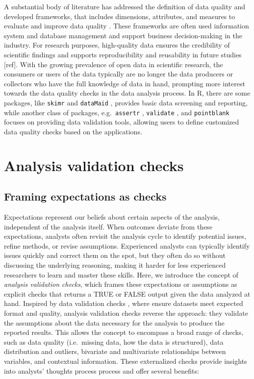 \documentclass[
  12pt,
]{interact}
\begin{document}
A substantial body of literature has addressed the definition of data
quality \citep[more]{8642813} and developed frameworks, that includes
dimensions, attributes, and measures to evaluate and improve data
quality
\citep{cai2015challenges, wang1996beyond, 6204995, woodall2014classification}.
These frameworks are often used information system and database
management and support business decision-making in the industry. For
research purposes, high-quality data ensures the credibility of
scientific findings and supports reproducibility and reusability in
future studies {[}ref{]}. With the growing prevalence of open data in
scientific research, the consumers or users of the data typically are no
longer the data producers or collectors who have the full knowledge of
data in hand, prompting more interest towards the data quality checks in
the data analysis process. In R, there are some packages, like
\texttt{skimr} \citep{skimr} and \texttt{dataMaid} \citep{dataMaid},
provides basic data screening and reporting, while another class of
packages, e.g.~\texttt{assertr} \citep{assertr}, \texttt{validate}
\citep{validate}, and \texttt{pointblank} \citep{pointblank} focuses on
providing data validation tools, allowing users to define customized
data quality checks based on the applications.

\section{Analysis validation checks}\label{sec-plan}

\subsection{Framing expectations as
checks}\label{framing-expectations-as-checks}

Expectations represent our beliefs about certain aspects of the
analysis, independent of the analysis itself. When outcomes deviate from
these expectations, analysts often revisit the analysis cycle to
identify potential issues, refine methods, or revise assumptions.
Experienced analysts can typically identify issues quickly and correct
them on the spot, but they often do so without discussing the underlying
reasoning, making it harder for less experienced researchers to learn
and master these skills. Here, we introduce the concept of
\emph{analysis validation checks}, which frames these expectations or
assumptions as explicit checks that returns a TRUE or FALSE output given
the data analyzed at hand. Inspired by data validation checks
\citep{validate}, where ensure datasets meet expected format and
quality, analysis validation checks reverse the approach: they validate
the assumptions about the data necessary for the analysis to produce the
reported results. This allows the concept to encompass a broad range of
checks, such as data quality (i.e.~missing data, how the data is
structured), data distribution and outliers, bivariate and multivariate
relationships between variables, and contextual information. These
externalized checks provide insights into analysts' thoughts process
process and offer several benefits:
\end{document}
